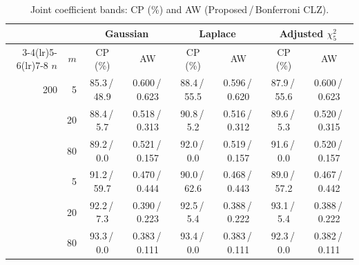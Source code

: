 \begin{table}[!tbp]
\centering
\caption{Joint coefficient bands: CP (\%) and AW (Proposed\,/\,Bonferroni CLZ).}
\label{tab:joint-new}
\renewcommand{\baselinestretch}{1}\footnotesize
\setlength{\tabcolsep}{3pt}
\renewcommand{\arraystretch}{1.08}
\begin{tabular}{@{}rr*{3}{cc}@{}}
\toprule
& & \multicolumn{2}{c}{Gaussian} & \multicolumn{2}{c}{Laplace} & \multicolumn{2}{c}{Adjusted $\chi^2_5$}\\
\cmidrule(lr){3-4}\cmidrule(lr){5-6}\cmidrule(lr){7-8}
$n$ & $m$ & CP (\%) & AW & CP (\%) & AW & CP (\%) & AW\\
\midrule
200 & 5 & 85.3\,/\,48.9 & 0.600\,/\,0.623 & 88.4\,/\,55.5 & 0.596\,/\,0.620 & 87.9\,/\,55.6 & 0.600\,/\,0.623\\
 & 20 & 88.4\,/\,5.7 & 0.518\,/\,0.313 & 90.8\,/\,5.2 & 0.516\,/\,0.312 & 89.6\,/\,5.3 & 0.520\,/\,0.315\\
 & 80 & 89.2\,/\,0.0 & 0.521\,/\,0.157 & 92.0\,/\,0.0 & 0.519\,/\,0.157 & 91.6\,/\,0.0 & 0.520\,/\,0.157\\
\addlinespace[3pt]
400 & 5 & 91.2\,/\,59.7 & 0.470\,/\,0.444 & 90.0\,/\,62.6 & 0.468\,/\,0.443 & 89.0\,/\,57.2 & 0.467\,/\,0.442\\
 & 20 & 92.2\,/\,7.3 & 0.390\,/\,0.223 & 92.5\,/\,5.4 & 0.388\,/\,0.222 & 93.1\,/\,5.4 & 0.388\,/\,0.222\\
 & 80 & 93.3\,/\,0.0 & 0.383\,/\,0.111 & 93.4\,/\,0.0 & 0.383\,/\,0.111 & 92.3\,/\,0.0 & 0.382\,/\,0.111\\
\bottomrule
\end{tabular}
\end{table}
